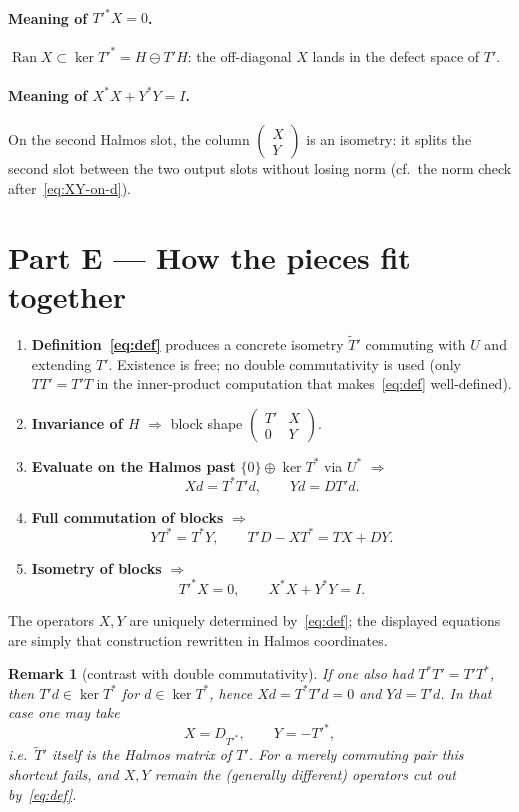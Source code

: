 \documentclass[11pt]{article}
\newtheorem{remark}{Remark}
\begin{document}
\paragraph{Meaning of \({T'}^*X=0\).}
\(\operatorname{Ran}X\subset\ker{T'}^*=H\ominus T'H\): the off-diagonal \(X\) lands in the
defect space of \(T'\).

\paragraph{Meaning of \(X^*X+Y^*Y=I\).}
On the second Halmos slot, the column \(\begin{pmatrix}X\\ Y\end{pmatrix}\) is an isometry:
it splits the second slot between the two output slots without losing norm
(cf.\ the norm check after~\eqref{eq:XY-on-d}).

\bigskip
\section*{Part E --- How the pieces fit together}

\begin{enumerate}
\item \textbf{Definition~\eqref{eq:def}} produces a concrete isometry \(\widetilde{T}'\) commuting
with \(U\) and extending \(T'\). Existence is free; no double commutativity is used
(only \(TT'=T'T\) in the inner-product computation that makes~\eqref{eq:def}
well-defined).

\item \textbf{Invariance of \(H\)} \(\Rightarrow\) block shape
\(\begin{pmatrix}T'&X\\ 0&Y\end{pmatrix}\).

\item \textbf{Evaluate on the Halmos past} \(\{0\}\oplus\ker T^*\) via \(U^*\)
\(\Rightarrow\)
\[
Xd=T^*T'd,\qquad Yd=DT'd.
\]

\item \textbf{Full commutation of blocks} \(\Rightarrow\)
\[
YT^*=T^*Y,\qquad T'D-XT^*=TX+DY.
\]

\item \textbf{Isometry of blocks} \(\Rightarrow\)
\[
{T'}^*X=0,\qquad X^*X+Y^*Y=I.
\]
\end{enumerate}

The operators \(X,Y\) are uniquely determined by~\eqref{eq:def}; the displayed
equations are simply that construction rewritten in Halmos coordinates.

\bigskip
\begin{remark}[contrast with double commutativity]
If one \emph{also} had \(T^*T'=T'T^*\), then \(T'd\in\ker T^*\) for \(d\in\ker T^*\),
hence \(Xd=T^*T'd=0\) and \(Yd=T'd\). In that case one may take
\[
X=D_{{T'}^*},\qquad Y=-{T'}^*,
\]
i.e.\ \(\widetilde{T}'\) itself is the Halmos matrix of \(T'\). For a merely commuting
pair this shortcut fails, and \(X,Y\) remain the (generally different) operators
cut out by~\eqref{eq:def}.
\end{remark}
\end{document}
